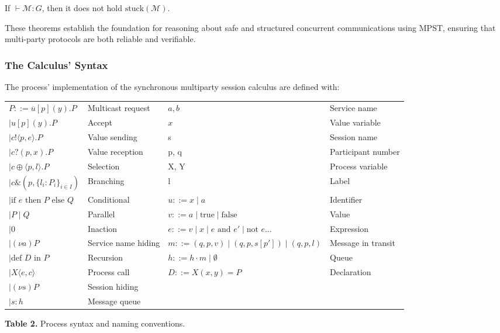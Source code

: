\begin{theorem}
    If \(\vdash \mathcal{M} : G\), then it does not hold \(\text{stuck}(\mathcal{M})\).
\end{theorem}

These theorems establish the foundation for reasoning about safe and structured
concurrent communications using MPST, ensuring that multi-party protocols
are both reliable and verifiable.

\subsubsection{The Calculus' Syntax}
The process' implementation of the synchronous multiparty session calculus are defined with:

\begin{center}
\begin{tabular}{ l l l l }
    $P ::= \overline{u}[p](y).P$      & Multicast request & $a, b$ & Service name \\
    $\mid u[p](y).P$                  & Accept & $x$ & Value variable \\
    $\mid c!\langle p,e \rangle.P$    & Value sending & s & Session name \\
    $\mid c?(p,x).P$                  & Value reception & p, q & Participant number \\
    $\mid c \oplus \langle p, l \rangle.P$ & Selection & X, Y & Process variable \\
    $\mid c \& (p, \{ l_i : P_i \}_{i \in I})$ & Branching & l & Label \\
    $\mid \text{if } e \text{ then } P \text{ else } Q$ & Conditional &  $u ::= x \mid a                  $& Identifier \\
    $\mid P \mid Q$ & Parallel &  $v ::= a \mid \text{true} \mid \text{false} $& Value \\
    $\mid 0       $ & Inaction & $e ::= v \mid x \mid e \text{ and } e' \mid \text{not } e \ldots $& Expression \\
    $\mid (\nu a)P$ & Service name hiding &  $m ::= (q, p, v) \mid (q, p, s[p']) \mid (q, p, l) $& Message in transit \\
    $\mid \text{def } D \text{ in } P$ & Recursion &  $h ::= h \cdot m \mid \emptyset  $& Queue \\
    $\mid X\langle e, c \rangle      $& Process call &  $D ::= X(x, y) = P               $& Declaration \\
    $\mid (\nu s)P$ & Session hiding &  \\
    $\mid s : h   $ & Message queue &  \\
\end{tabular}
\vspace{1em}
\textbf{Table 2.} Process syntax and naming conventions.
\end{center}


